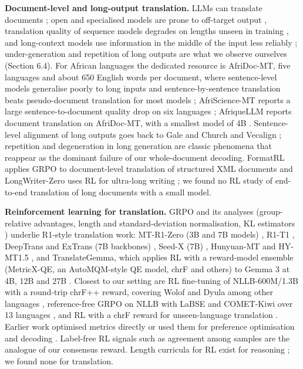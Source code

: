\textbf{Document-level and long-output translation.} LLMs can translate documents \citep{wang2023document}; open and specialised models are prone to off-target output \citep{wu2024adapting}, translation quality of sequence models degrades on lengths unseen in training \citep{varis2021sequence}, and long-context models use information in the middle of the input less reliably \citep{liu2024lost}; under-generation and repetition of long outputs are what we observe ourselves (Section 6.4). For African languages the dedicated resource is AfriDoc-MT, five languages and about 650 English words per document, where sentence-level models generalise poorly to long inputs and sentence-by-sentence translation beats pseudo-document translation for most models \citep{alabi2025afridocmt}; AfriScience-MT reports a large sentence-to-document quality drop on six languages \citep{abdulmumin2026afriscience}; AfriqueLLM reports document translation on AfriDoc-MT, with a smallest model of 4B \citep{yu2026afriquellm}. Sentence-level alignment of long outputs goes back to Gale and Church \citep{gale1993program} and Vecalign \citep{thompson2019vecalign}; repetition and degeneration in long generation are classic phenomena \citep{holtzman2020curious, welleck2020unlikelihood} that reappear as the dominant failure of our whole-document decoding. FormatRL applies GRPO to document-level translation of structured XML documents \citep{song2025formatrl} and LongWriter-Zero uses RL for ultra-long writing \citep{wu2025longwriterzero}; we found no RL study of end-to-end translation of long documents with a small model.

\textbf{Reinforcement learning for translation.} GRPO \citep{shao2024deepseekmath} and its analyses \citep{guo2025deepseekr1, liu2025understanding, yu2025dapo} (group-relative advantages, length and standard-deviation normalisation, KL estimators \citep{schulman2020approximating}) underlie R1-style translation work: MT-R1-Zero (3B and 7B models) \citep{feng2025mtr1zero}, R1-T1 \citep{he2025r1t1}, DeepTrans and ExTrans (7B backbones) \citep{wang2025deeptrans, wang2025extrans}, Seed-X (7B) \citep{cheng2025seedx}, Hunyuan-MT and HY-MT1.5 \citep{zheng2025hunyuanmt, zheng2025hymt15}, and TranslateGemma, which applies RL with a reward-model ensemble (MetricX-QE, an AutoMQM-style QE model, chrF and others) to Gemma 3 at 4B, 12B and 27B \citep{finkelstein2026translategemma}. Closest to our setting are RL fine-tuning of NLLB-600M/1.3B with a round-trip chrF++ reward, covering Wolof and Dyula among other languages \citep{attia2026roundtrip}, reference-free GRPO on NLLB with LaBSE and COMET-Kiwi over 13 languages \citep{garciaestrada2026reffree}, and RL with a chrF reward for unseen-language translation \citep{hu2026rlunseen}. Earlier work optimised metrics directly \citep{shen2016mrt} or used them for preference optimisation \citep{xu2024cpo} and decoding \citep{freitag2022mbr, fernandes2022qualityaware, eikema2020map}. Label-free RL signals such as agreement among samples \citep{zuo2025ttrl, wang2023selfconsistency} are the analogue of our consensus reward. Length curricula for RL exist for reasoning \citep{song2025fastcurl, hammoud2025trainlong}; we found none for translation.

